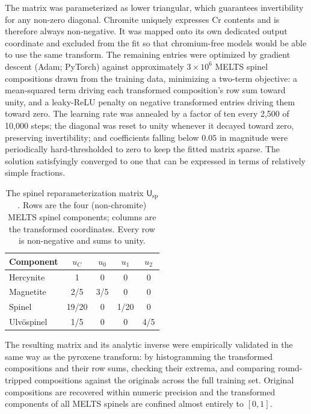 The matrix was parameterized as lower triangular, which guarantees invertibility for
any non-zero diagonal. Chromite uniquely expresses Cr contents and is therefore always 
non-negative. It was mapped onto its own dedicated output coordinate and excluded from the fit
so that chromium-free models would be able to use the same transform. The
remaining entries were optimized by gradient descent (Adam; PyTorch) against
approximately $3\times10^{6}$ \textsc{MELTS} spinel compositions drawn from the
training data, minimizing a two-term objective: a mean-squared term driving each
transformed composition's row sum toward unity, and a leaky-ReLU penalty on negative
transformed entries driving them toward zero. The learning rate was annealed by a
factor of ten every 2{,}500 of 10{,}000 steps; the diagonal was reset to unity
whenever it decayed toward zero, preserving invertibility; and coefficients falling
below $0.05$ in magnitude were periodically hard-thresholded to zero to keep the
fitted matrix sparse. The solution satisfyingly converged to one that can be expressed 
in terms of relatively simple fractions.

\begin{table}[t]
\centering
\caption{The spinel reparameterization matrix $\mathsf{U}_{\mathrm{sp}}$. Rows are
the four (non-chromite) \textsc{MELTS} spinel components; columns are the transformed
coordinates. Every row is non-negative and sums to unity.}
\label{tab:spmatrix}
\begin{tabular}{lcccc}
\toprule
Component & $u_C$ & $u_0$ & $u_1$ & $u_2$ \\
\midrule
Hercynite     & 1   & 0   & 0   & 0 \\
Magnetite    & 2/5 & 3/5   & 0   & 0 \\
Spinel      & 19/20 & 0  & 1/20   & 0 \\
Ulv\"ospinel & 1/5 & 0   & 0  & 4/5 \\
\bottomrule
\end{tabular}
\end{table}

The resulting matrix and its analytic inverse were empirically validated in the same way as the
pyroxene transform: by histogramming the transformed compositions and their row
sums, checking their extrema, and comparing round-tripped compositions against the
originals across the full training set. Original compositions are recovered within numeric precision 
and the transformed components of all \textsc{MELTS} spinels are confined almost entirely to $[0,1]$.

